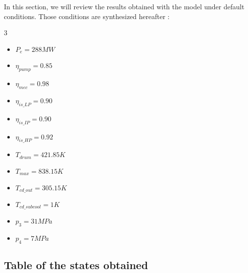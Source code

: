 In this section, we will review the results obtained with the model under default conditions. Those conditions are synthesized hereafter :

\begin{multicols}{3}
    \begin{itemize}
        \setlength\itemsep{0em}
        \item $P_e = 288 MW$
        \item $\eta_{pump} = 0.85$
        \item $\eta_{mec} = 0.98$
        \item $\eta_{is\_LP} = 0.90$
        \item $\eta_{is\_IP} = 0.90$
        \item $\eta_{is\_HP} = 0.92$
        \item $T_{drum} = 421.85K$
        \item $T_{max} = 838.15K$
        \item $T_{cd\_out} = 305.15K$
        \item $T_{cd\_subcool} = 1K$
        \item $p_3 = 31 MPa$
        \item $p_4 = 7 MPa$
    \end{itemize}
    \end{multicols}

\subsection{Table of the states obtained}


